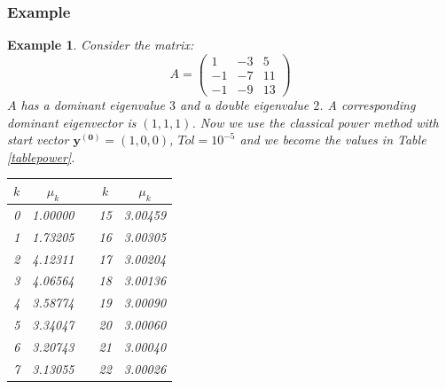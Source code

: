 \documentclass[a4paper,11pt]{report}
\newtheorem{example}[theorem]{Example}
\begin{document}
\subsubsection{Example}
\begin{example}\label{voorbeeldpower}
Consider the matrix:
$$A = \begin{pmatrix}  1 & -3 & 5\\
 -1 & -7 & 11\\
 -1 & -9 & 13
\end{pmatrix}$$
$A$ has a dominant eigenvalue $3$ and a double eigenvalue $2$. A corresponding dominant eigenvector is $(1,1,1)$. Now we use the 
classical power method with start vector $\mathbf{y^{(0)}} = (1, 0, 0)$, $Tol = 10^{-5}$ and we 
become the values in Table \ref{tablepower}. 
\begin{table}[h!]
\centering
\begin{tabular}{|r|r|r|r|r|}
\hline
\multicolumn{1}{|c|}{$k$} & \multicolumn{1}{c|}{$\mu_k$} & \multicolumn{1}{c|}{} & \multicolumn{1}{c|}{$k$} & \multicolumn{1}{c|}{$\mu_k$} \\ \hline
0                         & 1.00000                      &                       & 15                       & 3.00459                      \\ \hline
1                         & 1.73205                      &                       & 16                       & 3.00305                      \\ \hline
2                         & 4.12311                      &                       & 17                       & 3.00204                      \\ \hline
3                         & 4.06564                      &                       & 18                       & 3.00136                      \\ \hline
4                         & 3.58774                      &                       & 19                       & 3.00090                      \\ \hline
5                         & 3.34047                      &                       & 20                       & 3.00060                      \\ \hline
6                         & 3.20743                      &                       & 21                       & 3.00040                      \\ \hline
7                         & 3.13055                      &                       & 22                       & 3.00026                      \\ \hline

\end{tabular}
\end{table}
\end{example}
\end{document}
